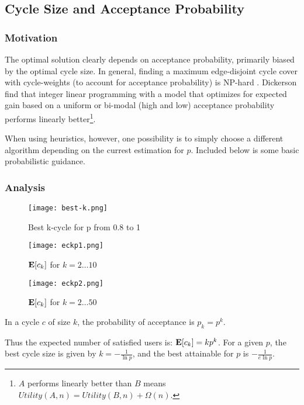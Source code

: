 \documentclass[main.tex]{subfiles}
\begin{document}
\subsection{Cycle Size and Acceptance Probability} \label{sec:cyc size}

\subsubsection{Motivation}
The optimal solution clearly depends on acceptance probability, primarily biased by the optimal cycle size. In general, finding a maximum edge-disjoint cycle cover with cycle-weights (to account for acceptance probability) is NP-hard \cite{Bir}. Dickerson \cite{Dick} \cite{Dick3} find that integer linear programming with a model that optimizes for expected gain based on a uniform or bi-modal (high and low) acceptance probability performs linearly better\footnote{$A$ performs linearly better than $B$ means $Utility(A,n) = Utility(B,n) + \Omega(n)$.}.

When using heuristics, however, one possibility is to simply choose a different algorithm depending on the currest estimation for $p$. Included below is some basic probabilistic guidance.

\subsubsection{Analysis}

\begin{figure}
  \texttt{[image: best-k.png]}
  \caption{Best k-cycle for p from 0.8 to 1}
  \label{best-k}
\end{figure}

\begin{figure}
  \texttt{[image: eckp1.png]}
  \caption{$\mathbf{E}[c_k]$ for $k = 2 \dots 10$}
  \label{eckp1}
\end{figure}

\begin{figure}
  \texttt{[image: eckp2.png]}
  \caption{$\mathbf{E}[c_k]$ for $k = 2 \dots 50$}
  \label{eckp2}
\end{figure}

In a cycle $c$ of size $k$, the probability of acceptance is $p_k = p^k$.

Thus the expected number of satisfied users is: $\mathbf{E}[c_k] = k p^k$. For a given $p$, the best cycle size is given by $k = -\frac{1}{\ln p}$, and the best attainable for $p$ is $-\frac{1}{e \ln p}$.
\end{document}
